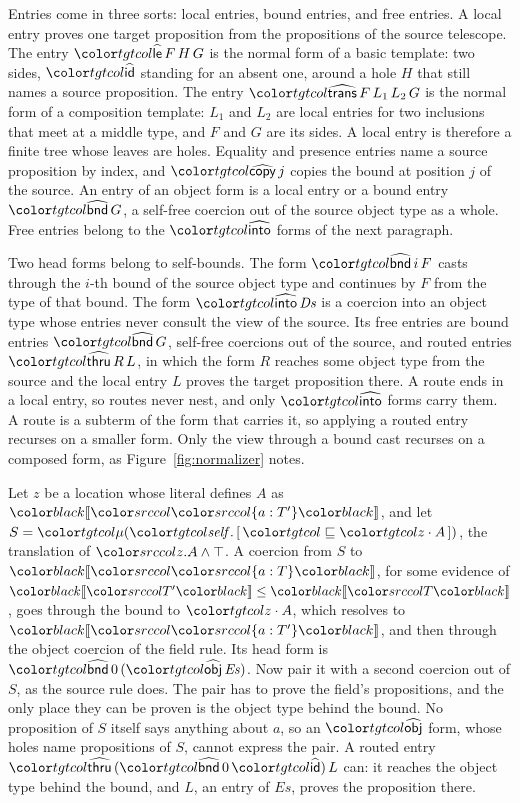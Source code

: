 Entries come in three sorts: local entries, bound entries, and free entries. A local entry proves one target proposition from the propositions of the source telescope. The entry $\form{le}\,F\,H\,G$ is the normal form of a basic template: two sides, $\form{id}$ standing for an absent one, around a hole $H$ that still names a source proposition. The entry $\form{trans}\,F\,L_1\,L_2\,G$ is the normal form of a composition template: $L_1$ and $L_2$ are local entries for two inclusions that meet at a middle type, and $F$ and $G$ are its sides. A local entry is therefore a finite tree whose leaves are holes. Equality and presence entries name a source proposition by index, and $\form{copy}\,j$ copies the bound at position $j$ of the source. An entry of an object form is a local entry or a bound entry $\form{bnd}\,G$, a self-free coercion out of the source object type as a whole. Free entries belong to the $\form{into}$ forms of the next paragraph.

Two head forms belong to self-bounds. The form $\form{bnd}\,i\,F$ casts through the $i$-th bound of the source object type and continues by $F$ from the type of that bound. The form $\form{into}\,\mathit{Ds}$ is a coercion into an object type whose entries never consult the view of the source. Its free entries are bound entries $\form{bnd}\,G$, self-free coercions out of the source, and routed entries $\form{thru}\,R\,L$, in which the form $R$ reaches some object type from the source and the local entry $L$ proves the target proposition there. A route ends in a local entry, so routes never nest, and only $\form{into}$ forms carry them. A route is a subterm of the form that carries it, so applying a routed entry recurses on a smaller form. Only the view through a bound cast recurses on a composed form, as Figure~\ref{fig:normalizer} notes.

\begin{example}
Let $z$ be a location whose literal defines $A$ as $\trans{\dfld{a}{T'}}$, and let $S = \obj{[\,\pbnd{\sel{z}{A}}\,]}$, the translation of $\src{z.A \wedge \top}$. A coercion from $S$ to $\trans{\dfld{a}{T}}$, for some evidence of $\trans{T'} \le \trans{T}$, goes through the bound to $\sel{z}{A}$, which resolves to $\trans{\dfld{a}{T'}}$, and then through the object coercion of the field rule. Its head form is $\form{bnd}\,0\,(\form{obj}\,\mathit{Es})$. Now pair it with a second coercion out of $S$, as the source rule  does. The pair has to prove the field's propositions, and the only place they can be proven is the object type behind the bound. No proposition of $S$ itself says anything about $a$, so an $\form{obj}$ form, whose holes name propositions of $S$, cannot express the pair. A routed entry $\form{thru}\,(\form{bnd}\,0\,\form{id})\,L$ can: it reaches the object type behind the bound, and $L$, an entry of $\mathit{Es}$, proves the proposition there.
\end{example}

